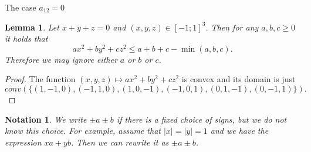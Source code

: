\documentclass[12pt]{article}
\newtheorem{lemma}{Lemma}[section]
\newtheorem{notation}{Notation}[section]
\begin{document}
\begin{section}{The case \texorpdfstring{$a_{12} = 0$}{Lg}}
\label{s8}
    \begin{lemma}
    \label{sss}
        Let $x+y+z=0$ and $(x,y,z)\in[-1;1]^3$. Then for any $a,b,c \geq 0$ it holds that 
        $$
            ax^2+by^2+cz^2 \leq a+b+c-\min(a,b,c).
        $$
        Therefore we may ignore  either $a$ or $b$ or $c$.
    \end{lemma}

    \begin{proof}
        The function $(x,y,z)\mapsto ax^2 + by^2 + cz^2$ is convex and its domain is just $$conv(\{(1,-1,0), (-1,1,0),(1,0,-1), (-1,0,1),(0,1,-1),(0,-1,1)\}).$$ 
    \end{proof}

    


        


    \begin{notation}
        We write $\pm a \pm b$ if there is a fixed choice of signs, but we do not know this choice. For example, assume that $|x|=|y|=1$ and  we have the expression $xa+yb$. Then we can rewrite it as $\pm a \pm b$.
    \end{notation}



\end{section}
\end{document}
